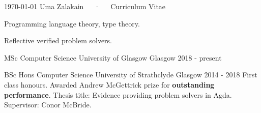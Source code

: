 \documentclass[11pt, a4paper]{awesome-cv}
\begin{document}
\makecvheader

\makecvfooter
  {\today}
  {Uma Zalakain~~~·~~~Curriculum Vitae}
  {\thepage}




\begin{cvitems}
    \item Programming language theory, type theory.
    \item Reflective verified problem solvers.
\end{cvitems}


\begin{cventries}
    \cventry
      {MSc Computer Science} %
      {University of Glasgow} %
      {Glasgow} %
      {2018 - present} %
      {}

    \cventry
      {BSc Hons Computer Science} %
      {University of Strathclyde} %
      {Glasgow} %
      {2014 - 2018} %
      {
          First class honours. Awarded Andrew McGettrick prize for
          \textbf{outstanding performance}.\newline
          Thesis title: Evidence providing problem solvers in Agda.\newline
          Supervisor: Conor McBride.\newline
      }
\end{cventries}

\end{document}
